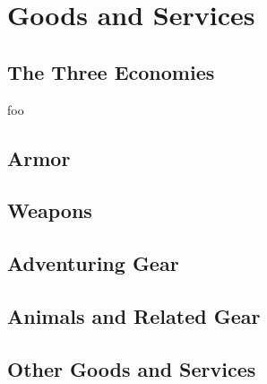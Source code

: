 
\newcommand{\armorentry}[4]{\ability{#1}{#3\newline\indent\textbullet{ #4}}}


\chapter{Goods and Services}
\section{The Three Economies}
foo
\section{Armor}

\section{Weapons}

\section{Adventuring Gear}

\section{Animals and Related Gear}

\section{Other Goods and Services}
